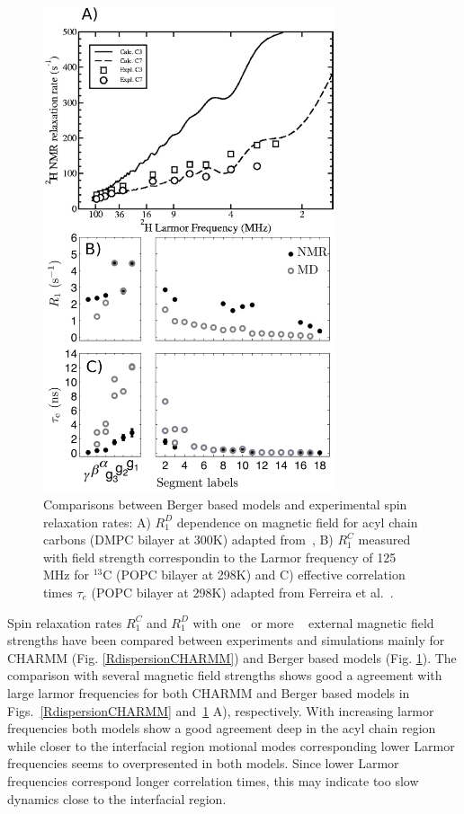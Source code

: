 \documentclass[aps,prl,superscriptaddress,twocolumn]{revtex4}
\begin{document}
\begin{figure}[]
  \includegraphics[width=8.6cm]{../Fig/RandEFFCT.eps}
\newline
  \caption{\label{RandEFFCT}
    Comparisons between Berger based models and experimental spin relaxation rates:
    A) $R_1^{D}$ dependence on magnetic field for acyl chain carbons (DMPC bilayer at 300K) adapted from~\cite{wohlert06},
    B) $R_1^{C}$ measured with field strength correspondin to the Larmor frequency of 125 MHz for $^{13}$C (POPC bilayer at 298K) and
    C) effective correlation times $\tau_e$ (POPC bilayer at 298K) adapted from Ferreira et al.~\cite{ferreira15}.
  } 
\end{figure}

Spin relaxation rates $R_1^{C}$ and $R_1^{D}$ with one~\cite{feller02,eldho03,ollila07a,klauda08b,ferreira15} 
or more ~\cite{pastor88,lindahl01,pastor02,klauda08a,klauda08b,wohlert06,klauda12} external magnetic field 
strengths have been compared between experiments and simulations mainly for CHARMM (Fig. \ref{RdispersionCHARMM}) 
and Berger based models (Fig. \ref{RandEFFCT}). The comparison with several
magnetic field strengths shows good a agreement with large larmor frequencies 
for both CHARMM and Berger based models in Figs.~\ref{RdispersionCHARMM} and~\ref{RandEFFCT} A), respectively.
With increasing larmor frequencies both models show a good agreement deep in the acyl chain region
while closer to the interfacial region motional modes corresponding lower Larmor frequencies seems to overpresented
in both models. Since lower Larmor frequencies correspond longer correlation times, this may
indicate too slow dynamics close to the interfacial region. 
\end{document}
